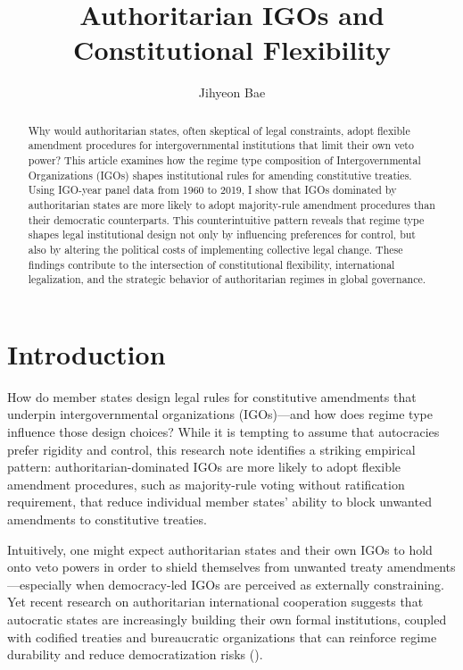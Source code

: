 \documentclass[12pt]{article}
\title{Authoritarian IGOs and Constitutional Flexibility}
\author{Jihyeon Bae}
\date{}
\begin{document}
\maketitle

\begin{abstract}
Why would authoritarian states, often skeptical of legal constraints, adopt flexible amendment procedures for intergovernmental institutions that limit their own veto power? This article examines how the regime type composition of Intergovernmental Organizations (IGOs) shapes institutional rules for amending constitutive treaties. Using IGO-year panel data from 1960 to 2019, I show that IGOs dominated by authoritarian states are more likely to adopt majority-rule amendment procedures than their democratic counterparts. This counterintuitive pattern reveals that regime type shapes legal institutional design not only by influencing preferences for control, but also by altering the political costs of implementing collective legal change. These findings contribute to the intersection of constitutional flexibility, international legalization, and the strategic behavior of authoritarian regimes in global governance.
\end{abstract}

\section{Introduction}
How do member states design legal rules for constitutive amendments that underpin intergovernmental organizations (IGOs)—and how does regime type influence those design choices? While it is tempting to assume that autocracies prefer rigidity and control, this research note identifies a striking empirical pattern: authoritarian-dominated IGOs are more likely to adopt flexible amendment procedures, such as majority-rule voting without ratification requirement, that reduce individual member states’ ability to block unwanted amendments to constitutive treaties.

Intuitively, one might expect authoritarian states and their own IGOs to hold onto veto powers in order to shield themselves from unwanted treaty amendments—especially when democracy-led IGOs are perceived as externally constraining. Yet recent research on authoritarian international cooperation suggests that autocratic states are increasingly building their own formal institutions, coupled with codified treaties and bureaucratic organizations that can reinforce regime durability and reduce democratization risks (\cite{debre2021}).
\end{document}
